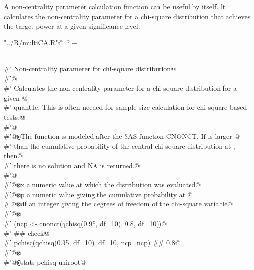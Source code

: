 \documentclass[reqno]{amsart}
\renewcommand{\NWtarget}[2]{\hypertarget{#1}{#2}}
\begin{document}
A non-centrality parameter calculation function can be useful by itself. It calculates the non-centrality parameter for a chi-square distribution that achieves the target power at a given significance level.

\begin{flushleft} \small\label{scrap14}\raggedright\small
\NWtarget{nuweb?}{} \verb@"../R/multiCA.R"@\nobreak\ {\footnotesize {?}}$\equiv$
\vspace{-1ex}
\begin{list}{}{} \item
\mbox{}\verb@@\\
\mbox{}\verb@#' Non-centrality parameter for chi-square distribution@\\
\mbox{}\verb@#'@\\
\mbox{}\verb@#' Calculates the non-centrality parameter for a chi-square distribution for a given @\\
\mbox{}\verb@#' quantile. This is often needed for sample size calculation for chi-square based tests.@\\
\mbox{}\verb@#'@\\
\mbox{}\verb@#'@{\tt @}\verb@details The function is modeled after the SAS function CNONCT. If  is larger @\\
\mbox{}\verb@#' than the cumulative probability of the central chi-square distribution at , then@\\
\mbox{}\verb@#' there is no solution and NA is returned.@\\
\mbox{}\verb@#'@\\
\mbox{}\verb@#'@{\tt @}\verb@param x a numeric value at which the distribution was evaluated@\\
\mbox{}\verb@#'@{\tt @}\verb@param p a numeric value giving the cumulative probability at @\\
\mbox{}\verb@#'@{\tt @}\verb@param df an integer giving the degrees of freedom of the chi-square variable@\\
\mbox{}\verb@#'@{\tt @}\verb@examples@\\
\mbox{}\verb@#' (ncp <- cnonct(qchisq(0.95, df=10), 0.8, df=10))@\\
\mbox{}\verb@#' ## check@\\
\mbox{}\verb@#' pchisq(qchisq(0.95, df=10), df=10, ncp=ncp)  ## 0.8@\\
\mbox{}\verb@#'@{\tt @}\verb@export@\\
\mbox{}\verb@#'@{\tt @}\verb@importFrom stats pchisq uniroot@\\

\end{list}
\end{flushleft}
\end{document}
